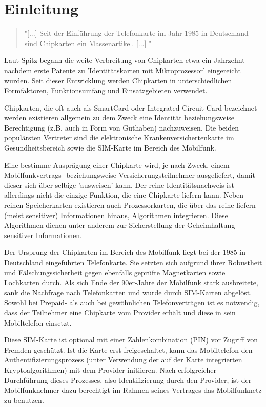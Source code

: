 \section[Einleitung (Schenkel)]{Einleitung}
\label{einleitung}
\begin{quote}
"[...] Seit der Einführung der Telefonkarte im Jahr 1985 in Deutschland sind Chipkarten ein
Massenartikel. [...] "\cite{spitz11}
\end{quote}

Laut Spitz begann die weite Verbreitung von Chipkarten etwa ein Jahrzehnt nachdem erste Patente
zu 'Identitätskarten mit Mikroprozessor' eingereicht wurden. Seit dieser Entwicklung
werden Chipkarten in unterschiedlichen Formfaktoren, Funktionsumfang und Einsatzgebieten
verwendet.

Chipkarten, die oft auch als SmartCard oder Integrated Circuit Card bezeichnet werden existieren
allgemein zu dem Zweck eine Identität beziehungsweise Berechtigung (z.B. auch in Form von Guthaben) nachzuweisen.
Die beiden populärsten Vertreter sind die elektronische Krankenversichertenkarte im Gesundheitsbereich
sowie die \ac{SIM}-Karte im Bereich des Mobilfunk.

Eine bestimme Ausprägung einer Chipkarte wird, je nach Zweck, einem Mobilfunk\-vertrags- beziehungsweise Versicherungsteilnehmer
ausgeliefert, damit dieser sich über selbige 'ausweisen' kann. Der reine Identitätsnachweis ist
allerdings nicht die einzige Funktion, die eine Chipkarte liefern kann. Neben reinen Speicherkarten
existieren auch Prozessorkarten, die über das reine liefern (meist sensitiver) Informationen hinaus,
Algorithmen integrieren. Diese Algorithmen dienen unter anderem zur Sicherstellung der Geheimhaltung
sensitiver Informationen.

Der Ursprung der Chipkarten im Bereich des Mobilfunk liegt bei der 1985 in Deutschland eingeführten
Telefonkarte. Sie setzten sich aufgrund ihrer Robustheit und Fälschungs\-sicherheit gegen ebenfalls
geprüfte Magnetkarten sowie Lochkarten durch. Als sich Ende der 90er-Jahre der Mobilfunk stark
ausbreitete, sank die Nachfrage nach Telefonkarten und wurde durch \ac{SIM}-Karten abgelöst.
Sowohl bei Prepaid- als auch bei gewöhnlichen Telefonverträgen ist es notwendig, dass der Teilnehmer
eine Chipkarte vom Provider erhält und diese in sein Mobiltelefon einsetzt.

Diese \ac{SIM}-Karte ist optional mit einer Zahlenkombination (\ac{PIN}) vor Zugriff von Fremden geschützt.
Ist die Karte erst freigeschaltet, kann das Mobiltelefon den Authentifizierungsprozess (unter Verwendung der
auf der Karte integrierten Kryptoalgorithmen) mit dem Provider initiieren. Nach erfolgreicher Durchführung
dieses Prozesses, also Identifizierung durch den Provider, ist der Mobilfunknehmer dazu berechtigt
im Rahmen seines Vertrages das Mobilfunknetz zu benutzen.

